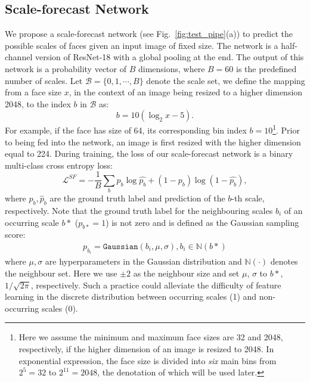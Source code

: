 \documentclass[10pt,twocolumn,letterpaper]{article}
\begin{document}
\subsection{Scale-forecast Network}\label{sec:scale-forecast-network}
We propose a scale-forecast network (see Fig.~\ref{fig:test_pipe}(a)) to predict the possible scales of faces given an input image of  fixed size.
The network is a half-channel version of ResNet-18 with a global pooling at the end. The output of this network is a probability vector of $B$ dimensions, where $B=60$ is the predefined number of scales. 
Let $\mathcal{B}=\{0, 1, \cdots, B\}$ denote the scale set, we define the mapping from a face size $x$, in the context of an image being resized to a higher dimension 2048, to the index $b$ in $\mathcal{B}$ as:
\begin{equation}
   b = 10 ( \log_2 x -5).
\end{equation}
For example, if the face has size of 64, its corresponding bin index $b=10$\footnote{Here we assume the minimum and maximum face sizes are 32 and 2048, respectively, if the higher dimension of an image is resized to 2048. In exponential expression, the face size is divided into \textit{six} main bins from $2^5=32$ to $2^{11}=2048$, the denotation of which  will be used later.}.
%
Prior to being fed into the network, an image is first resized with the higher dimension equal to 224. During training,  the loss of our scale-forecast network is a binary multi-class cross entropy loss:
\begin{equation}
	\mathcal{L}^{SF} = -\frac{1}{B} \sum_{b} p_b \log \hat{p_b} + (1 - p_b) \log (1 - \hat{p_b}),
\end{equation}
where
$p_b, \hat{p}_b$ are the ground truth label and %
prediction of the $b$-th scale, respectively.
Note that the ground truth label for the neighbouring scales $b_i$ of an occurring scale $b*$ ($p_{b*}=1$) is not zero and is defined as the Gaussian sampling score:
\begin{gather}
 p_{b_i}=\texttt{Gaussian}(b_i, \mu, \sigma), b_i \in \mathbb{N}(b*)
\end{gather}
where $\mu, \sigma$ are hyperparameters in the Gaussian distribution and $\mathbb{N(\cdot)}$ denotes the neighbour set. Here we use $ \pm 2$ as the neighbour size and set $\mu$, $\sigma$ to $b*$, $1/\sqrt{2\pi}$, respectively. Such a practice could alleviate the difficulty of feature learning in the discrete distribution between occurring scales (1) and non-occurring scales (0). 
\end{document}
